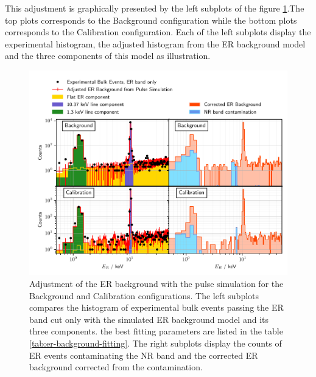 This adjustment is graphically presented by the left subplots of the figure \ref{fig:neutron-contamination}.The top plots corresponds to the Background configuration while the bottom plots corresponds to the Calibration configuration. Each of the left subplots display the experimental histogram, the adjusted histogram from the ER background model and the three components of this model as illustration. 

\begin{figure}
\centering
\includegraphics[scale=1]{Figures/Neutron/neutron_contamination.pdf}
\caption{Adjustment of the ER background with the pulse simulation for the Background and Calibration configurations. The left subplots compares the histogram of experimental bulk events passing the ER band cut only with the simulated ER background model and its three components. the best fitting parameters are listed in the table \ref{tab:er-background-fitting}. The right subplots display the counts of ER events contaminating the NR band and the corrected ER background corrected from the contamination. }
\label{fig:neutron-contamination}
\end{figure}

